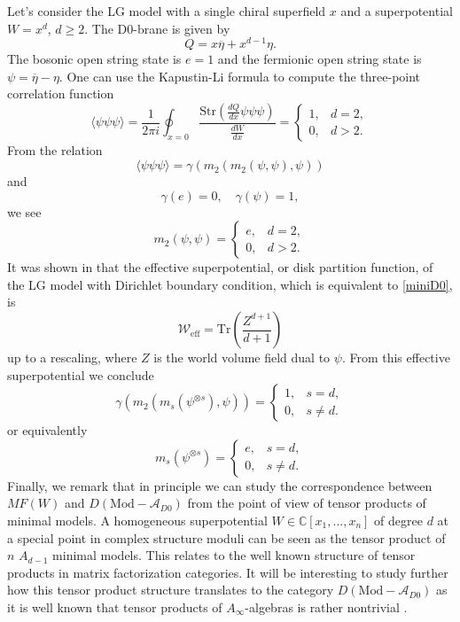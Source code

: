 \documentclass[a4paper,11pt]{article}
\numberwithin{equation}{section}
\begin{document}
Let's consider the LG model with a single chiral superfield $x$ and a 
superpotential $W = x^d$, $d \geq 2$. The D0-brane is given by
\begin{equation}\label{miniD0}
Q = x\overline{\eta} + x^{d-1}\eta.
\end{equation}
The bosonic open string state is $e = 1$ and the fermionic open string state is 
$\psi = \overline{\eta} - \eta$. One can use the Kapustin-Li formula 
\cite{Kapustin:2003ga} to compute the three-point correlation function
\[
\langle \psi \psi \psi \rangle = \frac{1}{2 \pi i} \oint_{x=0} 
\frac{\mathrm{Str}\left( \frac{dQ}{dx} \psi \psi \psi \right)}{\frac{dW}{dx}} = 
\left\{ \begin{array}{ll}
1, & d=2, \\
0, & d>2.
\end{array} \right.
\]
From the relation
\[
\langle \psi \psi \psi \rangle = \gamma\left( m_2(m_2(\psi,\psi),\psi) \right)
\]
and
\[
\gamma(e)=0,\quad \gamma(\psi) = 1,
\]
we see
\[
m_2(\psi,\psi) = \left\{ \begin{array}{ll}
e, & d=2, \\
0, & d>2.
\end{array} \right.
\]
It was shown in \cite{Govindarajan:2006uy} that the effective superpotential, or disk partition function, of the LG model with Dirichlet boundary condition, which is equivalent to \eqref{miniD0}, is
\[
\mathcal{W}_{\mathrm{eff}} = \mathrm{Tr}\left( \frac{Z^{d+1}}{d+1} \right)
\]
up to a rescaling, where $Z$ is the world volume field dual to $\psi$. From 
this effective superpotential we conclude
\[
\gamma\left( m_2(m_s(\psi^{\otimes s}),\psi) \right) = \left\{ \begin{array}{ll}
1, & s=d, \\
0, & s \neq d.
\end{array} \right.
\]
or equivalently
\[
m_s(\psi^{\otimes s}) = \left\{ \begin{array}{ll}
e, & s=d, \\
0, & s \neq d.
\end{array} \right.
\]
Finally, we remark that in principle we can study the correspondence between 
$MF(W)$ and $D(\mathrm{Mod}-\mathcal{A}_{D0})$ from the point of view of tensor 
products of minimal models. A homogeneous superpotential $W\in\mathbb{C}[x_{1},
\ldots,x_{n}]$ of degree $d$ at a special point in complex structure 
moduli can be seen as the tensor product of $n$ $A_{d-1}$ minimal models. This 
relates to the well known structure of tensor products in matrix factorization 
categories. It will be interesting to study further how this tensor product 
structure translates to the category $D(\mathrm{Mod}-\mathcal{A}_{D0})$ as it 
is 
well known that tensor products of $A_{\infty}$-algebras is rather nontrivial 
\cite{Gaberdiel:1997ia,saneblidze2000diagonal,loday2011diagonal}.
\end{document}
